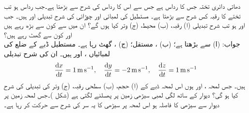 دھاتی دائری تختہ جس کا رداس  ہے  جس سے اس کا رداس  کی شرح سے بڑھتا ہے۔جب رداس 
 ہو تب تختے کا رقبہ کس شرح سے بڑھتا ہے۔
مستطیل کی لمبائی  اور چوڑائی  کی شرح تبدیلی  اور  ہیں۔ جب  اور  ہو تب شرح تبدیلی (ا) رقبہ، (ب) محیط، (ج) وتر کیا ہوں گے؟ ان میں سے کون سے بڑھ رہے ہیں اور کون سے گھٹ رہے ہیں؟ \\
جواب:\quad
(ا)  سے بڑھتا ہے؛ (ب) ، مستقل؛
 (ج) ، گھٹ رہا ہے۔ 
مستطیل ڈبے کے ضلع کی لمبائیاں ،  اور  ہیں۔ ان کی شرح تبدیلی
\begin{align*}
\frac{\dif x}{\dif t}=\SI{1}{\meter\per\second},\quad \frac{\dif y}{\dif t}=\SI{-2}{\meter\per\second},\quad \frac{\dif z}{\dif t}=\SI{1}{\meter\per\second}
\end{align*}
ہیں۔ جس لمحہ ،  اور  ہوں اس لمحہ ڈبے کے (ا) حجم، (ب) سطحی رقبہ، (ج) وتر  کی تبدیلی کی شرح کیا ہو گی؟ 
دیوار کے ساتھ لگی  لمبی  سیڑھی زمین پر پھسلنے  لگتی ہے (شکل )۔جس لمحہ زمین پر دیوار سے سیڑھی کا فاصلہ  ہو اس لمحہ پر سیڑھی کا یہ سر  کی  شرح سے حرکت کر رہا ہے۔
